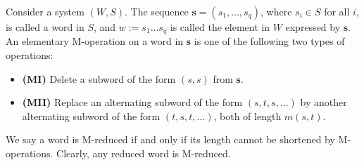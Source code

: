 \documentclass[../main.tex]{subfiles}
\begin{document}
\begin{definition}
    Consider a system $(W, S)$. The sequence $\mathbf{s} = (s_1, \dots, s_q)$, where $s_i \in S$ for all $i$, is called a word in $S$, and $w := s_1 \dots s_q$ is called the element in $W$ expressed by $\mathbf{s}$. An elementary M-operation on a word in $\mathbf{s}$ is one of the following two types of operations:

    \begin{itemize}
        \item \textbf{(MI)} Delete a subword of the form $(s, s)$ from $\mathbf{s}$.
        \item \textbf{(MII)} Replace an alternating subword of the form $(s, t, s, \dots)$ by another alternating subword of the form $(t, s, t, \dots)$, both of length $m(s,t)$.
    \end{itemize}

    We say a word is M-reduced if and only if its length cannot be shortened by M-operations. Clearly, any reduced word is M-reduced.
\end{definition}
\end{document}
